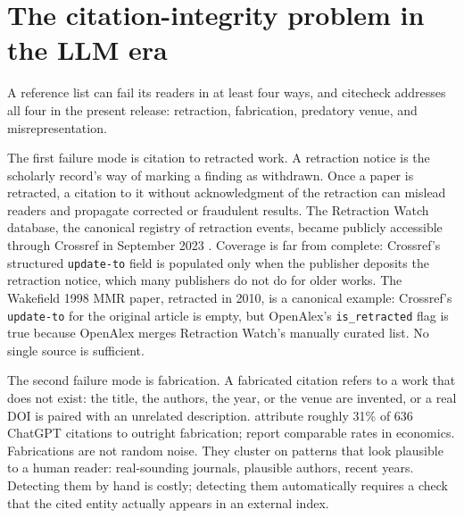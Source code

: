 \documentclass[12pt]{article}
\begin{document}
\section{The citation-integrity problem in the LLM era}\label{sec:problem}

A reference list can fail its readers in at least four ways, and citecheck addresses all four in the present release: retraction, fabrication, predatory venue, and misrepresentation.

The first failure mode is citation to retracted work. A retraction notice is the scholarly record's way of marking a finding as withdrawn. Once a paper is retracted, a citation to it without acknowledgment of the retraction can mislead readers and propagate corrected or fraudulent results. The Retraction Watch database, the canonical registry of retraction events, became publicly accessible through Crossref in September 2023 \citep{retraction_watch}. Coverage is far from complete: Crossref's structured \texttt{update-to} field is populated only when the publisher deposits the retraction notice, which many publishers do not do for older works. The Wakefield 1998 MMR paper, retracted in 2010, is a canonical example: Crossref's \texttt{update-to} for the original article is empty, but OpenAlex's \texttt{is\_retracted} flag is true because OpenAlex merges Retraction Watch's manually curated list. No single source is sufficient.

The second failure mode is fabrication. A fabricated citation refers to a work that does not exist: the title, the authors, the year, or the venue are invented, or a real DOI is paired with an unrelated description. \citet{walters_wilder_2023} attribute roughly 31\% of 636 ChatGPT citations to outright fabrication; \citet{buchanan_hill_shapoval_2024} report comparable rates in economics. Fabrications are not random noise. They cluster on patterns that look plausible to a human reader: real-sounding journals, plausible authors, recent years. Detecting them by hand is costly; detecting them automatically requires a check that the cited entity actually appears in an external index.
\end{document}
